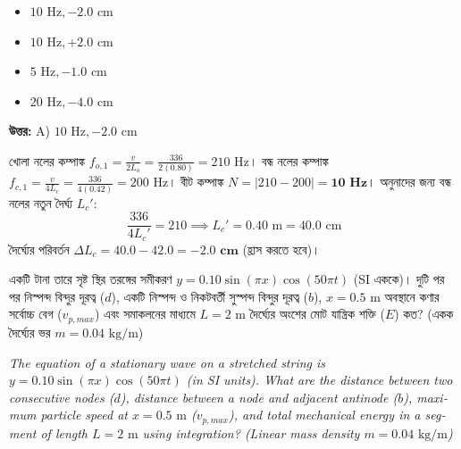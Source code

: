 \documentclass[12pt, a4paper]{article}
\begin{document}
\begin{itemize}[label={}, leftmargin=1cm, itemsep=0.5em]
    \item[\textbf{A)}] $10\text{ Hz}, -2.0\text{ cm}$
    \item[\textbf{B)}] $10\text{ Hz}, +2.0\text{ cm}$
    \item[\textbf{C)}] $5\text{ Hz}, -1.0\text{ cm}$
    \item[\textbf{D)}] $20\text{ Hz}, -4.0\text{ cm}$
\end{itemize}

\vspace{0.5em}
\begin{tcolorbox}[answerbox]
    \textbf{\color{success} উত্তর:} A) $10\text{ Hz}, -2.0\text{ cm}$
\end{tcolorbox}
\vspace{1em}

\begin{tcolorbox}[solutionbox={সমাধান (Solution)}]
    \noindent
    খোলা নলের কম্পাঙ্ক $f_{o,1} = \frac{v}{2L_o} = \frac{336}{2(0.80)} = 210\text{ Hz}$। বন্ধ নলের কম্পাঙ্ক $f_{c,1} = \frac{v}{4L_c} = \frac{336}{4(0.42)} = 200\text{ Hz}$। বীট কম্পাঙ্ক $N = |210 - 200| = \mathbf{10\text{ Hz}}$। অনুনাদের জন্য বন্ধ নলের নতুন দৈর্ঘ্য $L_c'$:
    \[ \frac{336}{4L_c'} = 210 \implies L_c' = 0.40\text{ m} = 40.0\text{ cm} \]
    দৈর্ঘ্যের পরিবর্তন $\Delta L_c = 40.0 - 42.0 = \mathbf{-2.0\text{ cm}}$ (হ্রাস করতে হবে)।
\end{tcolorbox}

\vspace{2em}

\begin{tcolorbox}[questionbox={প্রশ্ন (Question) 19}]
    \noindent
    একটি টানা তারে সৃষ্ট স্থির তরঙ্গের সমীকরণ $y = 0.10 \sin(\pi x) \cos(50\pi t)$ (SI এককে)। দুটি পর পর নিস্পন্দ বিন্দুর দূরত্ব ($d$), একটি নিস্পন্দ ও নিকটবর্তী সুস্পন্দ বিন্দুর দূরত্ব ($b$), $x = 0.5\text{ m}$ অবস্থানে কণার সর্বোচ্চ বেগ ($v_{p,max}$) এবং সমাকলনের মাধ্যমে $L = 2\text{ m}$ দৈর্ঘ্যের অংশের মোট যান্ত্রিক শক্তি ($E$) কত? (একক দৈর্ঘ্যের ভর $m = 0.04\text{ kg/m}$)
    
    \vspace{0.8em}
    \begin{english}
    \noindent\textit{\color{darkgray}
    The equation of a stationary wave on a stretched string is $y = 0.10 \sin(\pi x) \cos(50\pi t)$ (in SI units). What are the distance between two consecutive nodes ($d$), distance between a node and adjacent antinode ($b$), maximum particle speed at $x = 0.5\text{ m}$ ($v_{p,max}$), and total mechanical energy in a segment of length $L = 2\text{ m}$ using integration? (Linear mass density $m = 0.04\text{ kg/m}$)
    }
    \end{english}
\end{tcolorbox}
\end{document}

